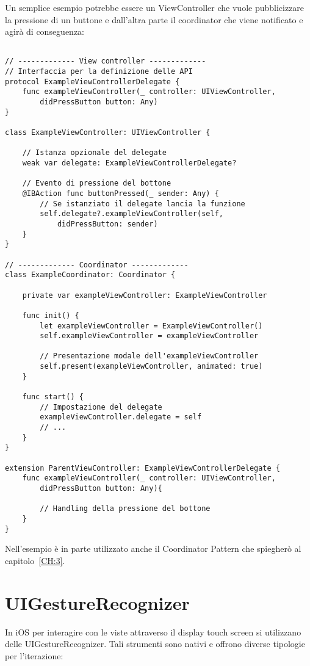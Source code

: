 Un semplice esempio potrebbe essere un ViewController che vuole
pubblicizzare la pressione di un buttone e dall'altra parte il coordinator
che viene notificato e agirà di conseguenza:

\begin{verbatim}

// ------------- View controller -------------
// Interfaccia per la definizione delle API
protocol ExampleViewControllerDelegate {
    func exampleViewController(_ controller: UIViewController,
        didPressButton button: Any)
}

class ExampleViewController: UIViewController {

    // Istanza opzionale del delegate
    weak var delegate: ExampleViewControllerDelegate?

    // Evento di pressione del bottone
    @IBAction func buttonPressed(_ sender: Any) {
        // Se istanziato il delegate lancia la funzione
        self.delegate?.exampleViewController(self,
            didPressButton: sender)
    }
}

// ------------- Coordinator -------------
class ExampleCoordinator: Coordinator {

    private var exampleViewController: ExampleViewController

    func init() {
        let exampleViewController = ExampleViewController()
        self.exampleViewController = exampleViewController

        // Presentazione modale dell'exampleViewController
        self.present(exampleViewController, animated: true)
    }

    func start() {
        // Impostazione del delegate
        exampleViewController.delegate = self
        // ...
    }
}

extension ParentViewController: ExampleViewControllerDelegate {
    func exampleViewController(_ controller: UIViewController,
        didPressButton button: Any){
        
        // Handling della pressione del bottone
    }
}
\end{verbatim}

Nell'esempio è in parte utilizzato anche il Coordinator Pattern che spiegherò al capitolo~\ref{CH:3}.

\section{UIGestureRecognizer}

In iOS per interagire con le viste attraverso il display touch screen si utilizzano delle UIGestureRecognizer.
Tali strumenti sono nativi e offrono diverse tipologie per l'iterazione:

